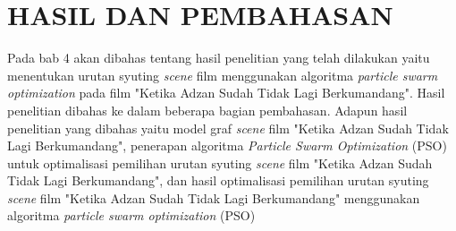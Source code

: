 \renewcommand{\thechapter}{\Roman{chapter}}
\chapter{HASIL DAN PEMBAHASAN}\label{babEmpat}
\renewcommand{\thechapter}{\arabic{chapter}}
\vspace{8mm}

{\frenchspacing
    Pada bab 4 akan dibahas tentang hasil penelitian yang telah dilakukan yaitu menentukan
    urutan syuting \textit{scene} film menggunakan algoritma \textit{particle swarm optimization}
    pada film "Ketika Adzan Sudah Tidak Lagi Berkumandang".
    Hasil penelitian dibahas ke dalam beberapa bagian pembahasan.
    Adapun hasil penelitian yang dibahas yaitu model graf \textit{scene} film "Ketika Adzan Sudah Tidak Lagi Berkumandang",
    penerapan algoritma \textit{Particle Swarm Optimization} (PSO) untuk optimalisasi pemilihan urutan syuting
    \textit{scene} film "Ketika Adzan Sudah Tidak Lagi Berkumandang", dan hasil optimalisasi pemilihan urutan
    syuting \textit{scene} film "Ketika Adzan Sudah Tidak Lagi Berkumandang" menggunakan algoritma \textit{particle swarm optimization} (PSO)
}

